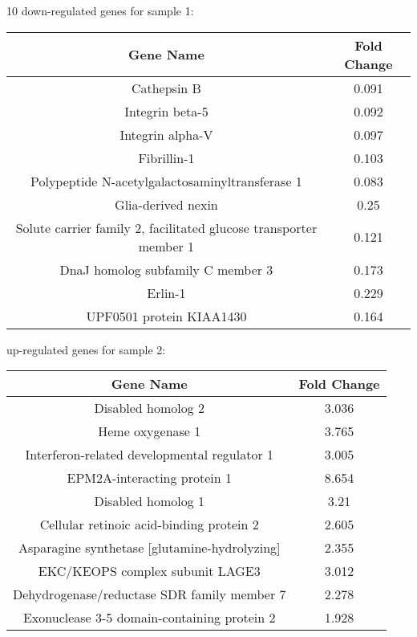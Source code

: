 \documentclass[10pt,a4paper]{article}
\begin{document}
10 down-regulated genes for sample 1:\\
\begin{tabular}{c | c}
	Gene Name & Fold Change\\
	\hline	
	Cathepsin B & 0.091\\   
	Integrin beta-5 & 0.092\\    
	Integrin alpha-V & 0.097\\    
	Fibrillin-1 & 0.103\\    
	Polypeptide N-acetylgalactosaminyltransferase 1 & 0.083\\    
	Glia-derived nexin & 0.25\\     
	Solute carrier family 2, facilitated glucose transporter member 1 & 0.121\\    
	DnaJ homolog subfamily C member 3 & 0.173\\    
	Erlin-1 & 0.229\\    
	UPF0501 protein KIAA1430 & 0.164\\
\end{tabular}
 up-regulated genes for sample 2:\\
\begin{tabular}{c | c}
	Gene Name & Fold Change\\
	\hline
	Disabled homolog 2 & 3.036\\    
	Heme oxygenase 1 & 3.765\\
	Interferon-related developmental regulator 1 & 3.005\\    
	EPM2A-interacting protein 1 & 8.654\\    
	Disabled homolog 1 & 3.21\\
	Cellular retinoic acid-binding protein 2 & 2.605\\
	Asparagine synthetase [glutamine-hydrolyzing] & 2.355\\   
	EKC/KEOPS complex subunit LAGE3 & 3.012\\
	Dehydrogenase/reductase SDR family member 7 & 2.278\\    
	Exonuclease 3-5 domain-containing protein 2 & 1.928\\
\end{tabular}\\
\end{document}
